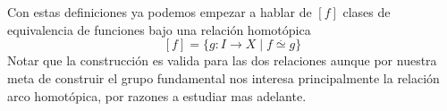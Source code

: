 Con estas definiciones ya podemos empezar a hablar de \([f]\) clases
de equivalencia de funciones bajo una relación homotópica
\[ [f] = \{ g : I \to X \mid f \stackrel{.}{\simeq} g \} \]
Notar que la construcción es valida para las dos relaciones aunque por
nuestra meta de construir el grupo fundamental nos interesa
principalmente la relación arco homotópica, por razones a estudiar mas
adelante.

